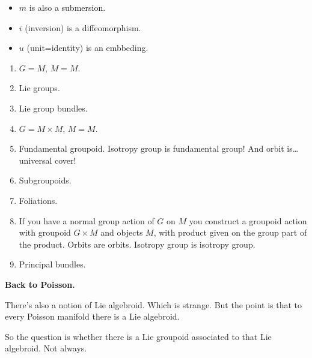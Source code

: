 \begin{proposition}
\begin{itemize}
\item \(m\) is also a submersion.
\item \(i\) (inversion) is a diffeomorphism.
\item  \(u\) (unit=identity) is an embbeding.
\end{itemize}
\end{proposition}


\begin{example}
\begin{enumerate}
\item \(G=M\),  \(M=M\).
 \item Lie groups.
	\item Lie group bundles.
\item \(G=M \times M\), \(M =M\).
 \item Fundamental groupoid. Isotropy group
 is fundamental group! And orbit
 is…\clearpage universal cover!
\item Subgroupoids.
\item  Foliations.
\item If you have a normal group action of
\(G\) on \(M\) you construct a groupoid
action with groupoid \(G \times M\) and
objects \(M\), with product given on the
group part of the product. Orbits are orbits.
Isotropy group is isotropy group.
 \item Principal bundles.
\end{enumerate}
\end{example}

{\bf Back to Poisson.}

There's also a notion of Lie algebroid. Which
is strange. But the point is that to every
Poisson manifold there is a Lie algebroid.

So the question is whether there is a Lie
groupoid associated to that Lie algebroid.
Not always.

